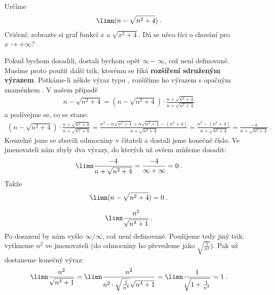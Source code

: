 \begin{example}
    Určíme
    \begin{align}
        \limn (n-\sqrt{n^2+4}) \:.
    \end{align}
    Cvičení: zobrazte si graf funkcí $x$ a $\sqrt{x^2+4}$. Dá se \textrm{něco} říci o chování pro $x \rightarrow +\infty$?

    Pokud bychom dosadili, dostali bychom opět $\infty - \infty$, což není definované. Musíme proto použít další trik, kterému se říká \textbf{rozšíření sdruženým výrazem}.
    Potkáme-li někde výraz typu , rozšíříme ho výrazem s opačným znaménkem . V našem případě
    \begin{align}
        n-\sqrt{n^2+4} = \left( n-\sqrt{n^2+4} \right) \cdot \frac{n + \sqrt{n^2+4}}{n + \sqrt{n^2+4}}
    \end{align}
    a podívejme se, co se stane:
    \begin{align}
        \left( n-\sqrt{n^2+4} \right) \cdot \frac{n + \sqrt{n^2+4}}{n + \sqrt{n^2+4}}
        =
        \frac{n^2 -n \sqrt{n^2+4} + n \sqrt{n^2+4} - (n^2+4)}{n + \sqrt{n^2+4}} 
        =
        \frac{n^2 - (n^2+4)}{n + \sqrt{n^2+4}} 
        =
        \frac{-4}{n + \sqrt{n^2+4}} 
        \:.
    \end{align}
    Kouzelně jsme se zbavili odmocniny v čitateli a dostali jsme konečné číslo. Ve jmenovateli nám zbyly dva výrazy, do kterých už ovšem můžeme dosadit:
    \begin{align}
        \limn \frac{-4}{n + \sqrt{n^2+4}}  =
        \frac{-4}{\infty + \infty} = 0 \:.
    \end{align}
    Takže
    \begin{align}
        \limn (n-\sqrt{n^2+4}) = 0 \:.
    \end{align}
\end{example}

\begin{example}
    \begin{align}
        \limn \frac{n^2}{\sqrt{n^4+1}} \:.
    \end{align}
    Po dosazení by nám vyšlo $\infty/\infty$, což není definované. Použijeme tedy jiný trik: vytkneme $n^2$ ve jmenovateli (do odmocniny ho převedeme jako $\sqrt{\frac{1}{n^4}}$). Pak už dostaneme konečný výraz:
    \begin{align}
        \limn \frac{n^2}{\sqrt{n^4+1}} = \limn \frac{n^2}{n^2 \cdot \sqrt{\frac{1}{n^4}}\sqrt{n^4+1}}
        =
        \limn \frac{1}{\sqrt{1 + \frac{1}{n^4}}} = 1 \:.
    \end{align}
\end{example}

